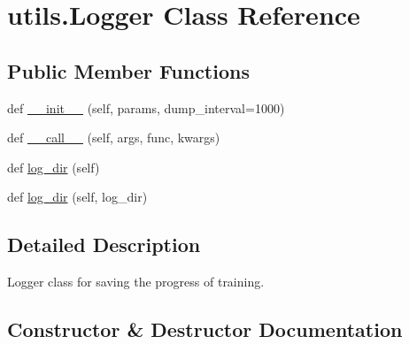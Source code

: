 \hypertarget{classutils_1_1Logger}{}\section{utils.\+Logger Class Reference}
\label{classutils_1_1Logger}
\subsection*{Public Member Functions}
\begin{DoxyCompactItemize}
\item 
def \hyperlink{classutils_1_1Logger_aaf70454f806ae064f4289a7133f6941d}{\+\_\+\+\_\+init\+\_\+\+\_\+} (self, params, dump\+\_\+interval=1000)
\item 
def \hyperlink{classutils_1_1Logger_ae36b75f351b406c7ddec930d1de69768}{\+\_\+\+\_\+call\+\_\+\+\_\+} (self, args, func, kwargs)
\item 
def \hyperlink{classutils_1_1Logger_aa9f043a740d882bb41830624208b79c5}{log\+\_\+dir} (self)
\item 
def \hyperlink{classutils_1_1Logger_a7c8306f54af28a9585a41d0cd0629984}{log\+\_\+dir} (self, log\+\_\+dir)
\end{DoxyCompactItemize}


\subsection{Detailed Description}
\begin{DoxyVerb}Logger class for saving the progress of training.
\end{DoxyVerb}
 

\subsection{Constructor \& Destructor Documentation}

